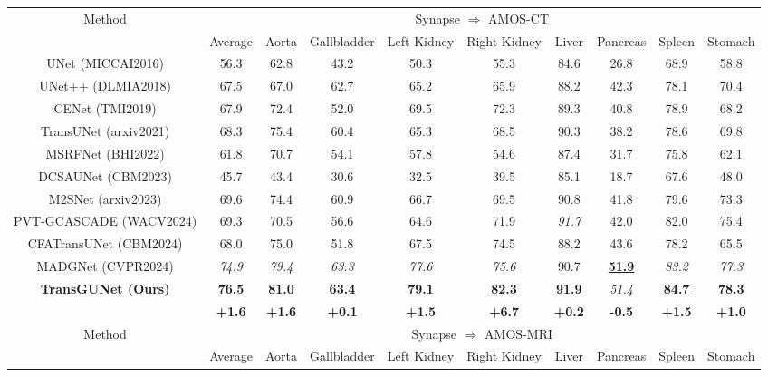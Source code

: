 \begin{table*}[t]
\begin{tabular}{c|c|cccccccc}
    \hline
    \multicolumn{1}{c|}{\multirow{2}{*}{Method}} & \multicolumn{9}{c}{Synapse $\Rightarrow$ AMOS-CT} \\ \cline{2-10}
     & Average & Aorta & Gallbladder & Left Kidney & Right Kidney & Liver & Pancreas & Spleen & Stomach \\
    \hline
    UNet \tiny{(MICCAI2016)}     & 56.3 & 62.8 & 43.2 & 50.3 & 55.3 & 84.6 & 26.8 & 68.9 & 58.8 \\
    UNet++ \tiny{(DLMIA2018)}    & 67.5 & 67.0 & 62.7 & 65.2 & 65.9 & 88.2 & 42.3 & 78.1 & 70.4 \\
    CENet \tiny{(TMI2019)}       & 67.9 & 72.4 & 52.0 & 69.5 & 72.3 & 89.3 & 40.8 & 78.9 & 68.2 \\
    TransUNet \tiny{(arxiv2021)} & 68.3 & 75.4 & 60.4 & 65.3 & 68.5 & 90.3 & 38.2 & 78.6 & 69.8 \\
    MSRFNet \tiny{(BHI2022)}     & 61.8 & 70.7 & 54.1 & 57.8 & 54.6 & 87.4 & 31.7 & 75.8 & 62.1 \\
    DCSAUNet \tiny{(CBM2023)}    & 45.7 & 43.4 & 30.6 & 32.5 & 39.5 & 85.1 & 18.7 & 67.6 & 48.0 \\
    M2SNet \tiny{(arxiv2023)}    & 69.6 & 74.4 & 60.9 & 66.7 & 69.5 & 90.8 & 41.8 & 79.6 & 73.3 \\
    PVT-GCASCADE \tiny{(WACV2024)} & 69.3 & 70.5 & 56.6 & 64.6 & 71.9 & \textit{91.7} & 42.0 & 82.0 & 75.4 \\
    CFATransUNet \tiny{(CBM2024)} & 68.0 & 75.0 & 51.8 & 67.5 & 74.5 & 88.2 & 43.6 & 78.2 & 65.5 \\
    MADGNet \tiny{(CVPR2024)}    & \textit{74.9} & \textit{79.4} & \textit{63.3} & \textit{77.6} & \textit{75.6} & 90.7 & \textbf{\underline{51.9}} & \textit{83.2} & \textit{77.3} \\
    \hline
    \multicolumn{1}{c|}{\multirow{2}{*}{\textbf{TransGUNet \tiny{(Ours)}}}} & \textbf{\underline{76.5}} & \textbf{\underline{81.0}} & \textbf{\underline{63.4}} & \textbf{\underline{79.1}} & \textbf{\underline{82.3}} & \textbf{\underline{91.9}} & \textit{51.4} & \textbf{\underline{84.7}} & \textbf{\underline{78.3}} \\ \cline{2-10}
    & \textbf{+1.6} & \textbf{+1.6} & \textbf{+0.1} & \textbf{+1.5} & \textbf{+6.7} & \textbf{+0.2} & \textbf{-0.5} & \textbf{+1.5} & \textbf{+1.0} \\
    \hline
    \multicolumn{1}{c|}{\multirow{2}{*}{Method}} & \multicolumn{9}{c}{Synapse $\Rightarrow$ AMOS-MRI} \\ \cline{2-10}
     & Average & Aorta & Gallbladder & Left Kidney & Right Kidney & Liver & Pancreas & Spleen & Stomach \\

\end{tabular}
\end{table*}
